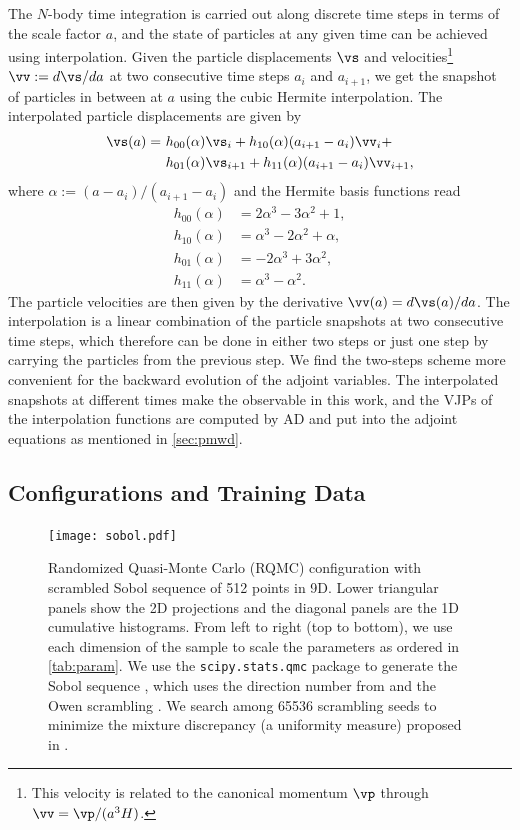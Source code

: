 \documentclass[modern, trackchanges, dvipsnames]{aastex631}
\renewcommand{\d}{d}
\begin{document}
The $N$-body time integration is carried out along discrete time steps
in terms of the scale factor $a$, and the state of particles at any
given time can be achieved using interpolation.
Given the particle displacements $\vs$ and velocities\footnote{This
velocity is related to the canonical momentum $\vp$ through $\vv =
\vp/(a^3H)$.} $\vv := \d\vs/\d a$ at two consecutive time steps $a_i$ and
$a_{i+1}$, we get the snapshot of particles in between at $a$ using the
cubic Hermite interpolation.
The interpolated particle displacements are given by
\begin{align}
  \vs(a) =\ &h_{00}(\alpha)\vs_i + h_{10}(\alpha)(a_{i+1} - a_i)\vv_i + \nonumber\\
           &h_{01}(\alpha)\vs_{i+1} + h_{11}(\alpha)(a_{i+1} - a_i)\vv_{i+1},
\end{align}
where $\alpha := (a - a_i)/(a_{i+1} - a_i)$ and the Hermite basis
functions read
\begin{align}
  h_{00}(\alpha) &= 2\alpha^3 - 3\alpha^2 + 1, \nonumber\\
  h_{10}(\alpha) &= \alpha^3 - 2\alpha^2 + \alpha, \nonumber\\
  h_{01}(\alpha) &= -2\alpha^3 + 3\alpha^2, \nonumber\\
  h_{11}(\alpha) &= \alpha^3 - \alpha^2.
\end{align}
The particle velocities are then given by the derivative $\vv(a) =
\d\vs(a) / \d a$.
The interpolation is a linear combination of the particle snapshots at
two consecutive time steps, which therefore can be done in either two
steps or just one step by carrying the particles from the previous step.
We find the two-steps scheme more convenient for the backward evolution
of the adjoint variables.
The interpolated snapshots at different times make the observable in
this work, and the VJPs of the interpolation functions are computed by
AD and put into the adjoint equations as mentioned in
\autoref{sec:pmwd}.


\vspace{1em}
\subsection{Configurations and Training Data}

\begin{figure}
  \centering
  \texttt{[image: sobol.pdf]}
  \caption{Randomized Quasi-Monte Carlo (RQMC) configuration with
    scrambled Sobol sequence of 512 points in 9D.
    Lower triangular panels show the 2D projections and the diagonal
    panels are the 1D cumulative histograms.
    From left to right (top to bottom), we use each dimension of the
    sample to scale the parameters as ordered in \autoref{tab:param}.
    We use the \texttt{scipy.stats.qmc} package \citep{SciPy} to
    generate the Sobol sequence \citep{Sobol1967}, which uses the
    direction number from \citet{JoeKuo2008} and the Owen scrambling
    \citep{Owen1998}.
    We search among 65536 scrambling seeds to minimize the mixture
    discrepancy (a uniformity measure) proposed in \citet{Zhou2013MD}.
  }
  \label{fig:sobol}
\end{figure}
\end{document}
